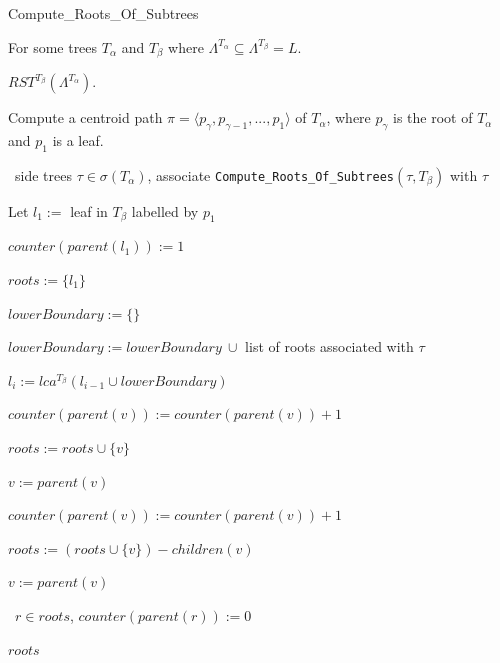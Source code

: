 \documentclass{article}
\newcommand{\leafset}{\Lambda}
\newcommand{\TA}{T_\alpha}
\newcommand{\TB}{T_\beta}
\begin{document}
    \begin{algorithm}
        \caption{Compute\_Roots\_Of\_Subtrees}
        \label{alg:computerootsofsubtrees}

        \begin{algorithmic}[1]
            \Input For some trees $\TA$ and $\TB$ where $\leafset^{\TA} \subseteq \leafset^{\TB} = L$.

            \Output $RST^{\TB}(\leafset^{\TA})$.

            \State Compute a centroid path $\pi = \langle p_{\gamma}, p_{\gamma - 1}, ..., p_1 \rangle$ of $\TA$, where $p_{\gamma}$ is the root of $\TA$ and $p_1$ is a leaf.

            \State \algorithmicforall\ side trees $\tau \in \sigma(\TA)$, associate \texttt{Compute\_Roots\_Of\_Subtrees}$(\tau, \TB)$ with $\tau$

            \State Let $l_1 :=$ leaf in $\TB$ labelled by $p_1$

            \State $counter(parent(l_1)) := 1$

            \State $roots := \{l_1\}$

                \State $lowerBoundary := \{\}$

                    \State $lowerBoundary := lowerBoundary\ \cup$ list of roots associated with $\tau$
                \EndFor

                \State $l_i := lca^{\TB}(l_{i-1} \cup lowerBoundary)$

                    \State $counter(parent(v)) := counter(parent(v)) + 1$

                    \State $roots := roots \cup \{v\}$

                    \State $v := parent(v)$

                        \State $counter(parent(v)) := counter(parent(v)) + 1$

                        \State $roots := (roots \cup \{v\}) - children(v)$

                        \State $v := parent(v)$
                    \EndWhile
                \EndFor
            \EndFor

            \State \algorithmicforall\ $r \in roots$, $counter(parent(r)) := 0$

            \State \Return $roots$
        \end{algorithmic}
    \end{algorithm}
\end{document}
